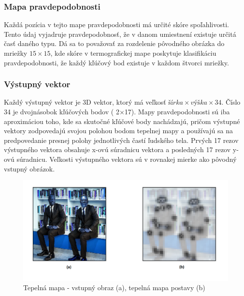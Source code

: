 \documentclass[slovak,master,dept460,male,cpp,cpdeclaration]{diploma}
\begin{document}
\subsubsection{Mapa pravdepodobnosti}
Každá pozícia v tejto mape pravdepodobnosti má určité skóre spoľahlivosti. Tento údaj vyjadruje pravdepodobnosť, že v danom umiestnení existuje určitá časť daného typu. Dá sa to považovať za rozdelenie pôvodného obrázka do mriežky \textit{$15\times 15$}, kde skóre v termografickej mape poskytuje klasifikáciu pravdepodobnosti, že každý kľúčový bod existuje v každom štvorci mriežky.

\subsubsection{Výstupný vektor}
Každý výstupný vektor je 3D vektor, ktorý má veľkosť \textit{$šírka  \times výška \times 34$}. Číslo 34 je dvojnásobok kľúčových bodov ( 2$\times$17). Mapy pravdepodobnosti sú iba aproximáciou toho, kde sa skutočné kľúčové body nachádzajú, pričom výstupné vektory zodpovedajú svojou polohou bodom tepelnej mapy a používajú sa na predpovedanie presnej polohy jednotlivých častí ľudského tela. Prvých 17 rezov výstupného vektora obsahuje x-ovú súradnicu vektora a posledných 17 rezov y-ovú súradnicu. Veľkosti výstupného vektora sú v rovnakej mierke ako pôvodný vstupný obrázok.

\begin{figure}[H]
	\centering
	\includegraphics[width=1\textwidth]{Figures/tfPose1.png}
	\caption{Tepelná mapa  - vstupný obraz (a), tepelná mapa postavy (b)\cite{githubTF}}
	\label{fig:tfPoseHeatmap}
\end{figure}
\end{document}
